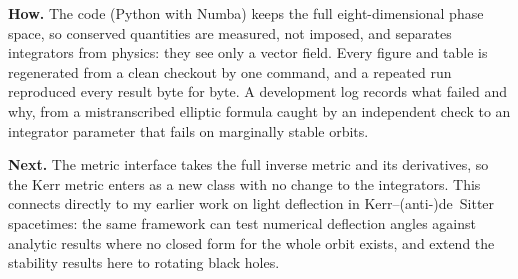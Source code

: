 \documentclass[11pt]{article}
\begin{document}
\textbf{How.} The code (Python with Numba) keeps the full eight-dimensional phase space, so
conserved quantities are measured, not imposed, and separates integrators from physics: they
see only a vector field. Every figure and table is regenerated from a clean checkout by one
command, and a repeated run reproduced every result byte for byte. A development log records
what failed and why, from a mistranscribed elliptic formula caught by an independent check to
an integrator parameter that fails on marginally stable orbits.

\textbf{Next.} The metric interface takes the full inverse metric and its derivatives, so the
Kerr metric enters as a new class with no change to the integrators. This connects directly to
my earlier work on light deflection in Kerr--(anti-)de~Sitter spacetimes: the same framework
can test numerical deflection angles against analytic results where no closed form for the
whole orbit exists, and extend the stability results here to rotating black holes.
\end{document}
